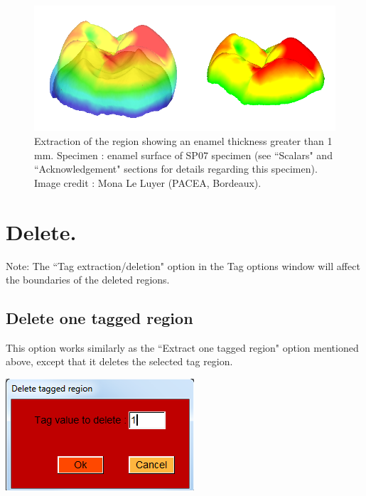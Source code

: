 \begin{figure}
  \centering
  \includegraphics[scale=0.6]{images/Tags/Extract_range.png} 
	\caption{Extraction of the region showing an enamel thickness greater than 1 mm. Specimen : enamel surface of SP07 specimen (see ``Scalars" and ``Acknowledgement" sections for details regarding this specimen). Image credit : Mona Le Luyer (PACEA, Bordeaux).}
\label{extract_scalar_range}
 
\end{figure}



\section{Delete.}

Note: The ``Tag extraction/deletion" option in the Tag options window will affect the boundaries of the deleted regions.
\subsection{Delete one tagged region}
\noindent
\begin{minipage}{0.5\textwidth}
This option works similarly as the ``Extract one tagged
region" option mentioned above, except that it deletes the
selected tag region.
\end{minipage}    
\begin{minipage}{0.5\textwidth}\centering
  \includegraphics[scale=0.5]{images/Tags/Delete_one_tagged_region.png}
 \end{minipage} 
\noindent




